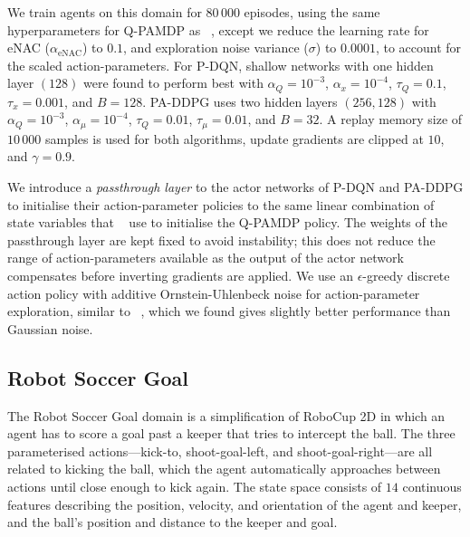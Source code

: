 \documentclass{article}
\def\PDQN*{P\nobreakdash-DQN}
\def\QPAMDP*{Q\nobreakdash-PAMDP}
\def\PADDPG*{PA\nobreakdash-DDPG}
\newcommand{\citet}[1]
{\citeauthor{#1}~\shortcite{#1}}
\newcommand{\citep}{\cite}
\begin{document}
We train agents on this domain for $80\,000$ episodes, using the same hyperparameters for \QPAMDP* as \citet{masson2016}, except we reduce the learning rate for eNAC ($\alpha_{\text{eNAC}}$) to $0.1$, and exploration noise variance ($\sigma$) to $0.0001$, to account for the scaled action-parameters. For \PDQN*, shallow networks with one hidden layer $(128)$ were found to perform best with $\alpha_Q = 10^{-3}$, $\alpha_x = 10^{-4}$, $\tau_Q = 0.1$, $\tau_x = 0.001$, and $B = 128$. \PADDPG* uses two hidden layers $(256,128)$ with $\alpha_Q = 10^{-3}$, $\alpha_\mu = 10^{-4}$, $\tau_Q = 0.01$, $\tau_\mu = 0.01$, and $B = 32$. A replay memory size of $10\,000$ samples is used for both algorithms, update gradients are clipped at $10$, and $\gamma = 0.9$.

We introduce a \emph{passthrough layer} to the actor networks of \PDQN* and \PADDPG* to initialise their action-parameter policies to the same linear combination of state variables that \citet{masson2016} use to initialise the \QPAMDP* policy. The weights of the passthrough layer are kept fixed to avoid instability; this does not reduce the range of action-parameters available as the output of the actor network compensates before inverting gradients are applied. We use an $\epsilon$-greedy discrete action policy with additive Ornstein-Uhlenbeck noise for action-parameter exploration, similar to \citet{lillicrap2015}, which we found gives slightly better performance than Gaussian noise.

\subsection{Robot Soccer Goal}
The Robot Soccer Goal domain \citep{masson2016} is a simplification of RoboCup 2D \citep{kitano1997} in which an agent has to score a goal past a keeper that tries to intercept the ball. The three parameterised actions---kick-to, shoot-goal-left, and shoot-goal-right---are all related to kicking the ball, which the agent automatically approaches between actions until close enough to kick again. The state space consists of $14$ continuous features describing the position, velocity, and orientation of the agent and keeper, and the ball's position and distance to the keeper and goal.
\end{document}
